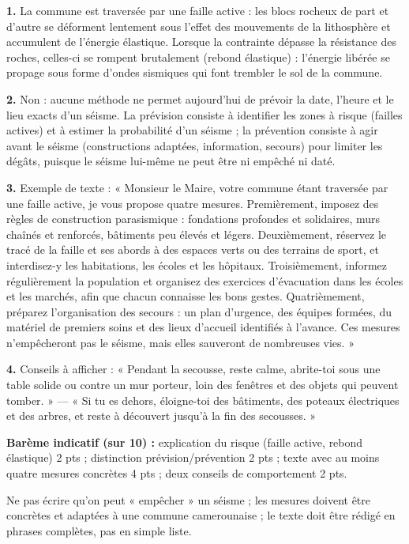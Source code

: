 \documentclass[11pt]{article}
\newcommand{\cle}[1]{{\popxbold\color{popdark}#1}}
\begin{document}
\begin{corrige}
\textbf{1.} La commune est traversée par une faille active : les blocs rocheux de part et d'autre se déforment lentement sous l'effet des mouvements de la lithosphère et accumulent de l'énergie élastique. Lorsque la contrainte dépasse la résistance des roches, celles-ci se rompent brutalement (rebond élastique) : l'énergie libérée se propage sous forme d'ondes sismiques qui font trembler le sol de la commune.

\textbf{2.} Non : aucune méthode ne permet aujourd'hui de prévoir la date, l'heure et le lieu exacts d'un séisme. La \cle{prévision} consiste à identifier les zones à risque (failles actives) et à estimer la probabilité d'un séisme ; la \cle{prévention} consiste à agir avant le séisme (constructions adaptées, information, secours) pour limiter les dégâts, puisque le séisme lui-même ne peut être ni empêché ni daté.

\textbf{3.} Exemple de texte : « Monsieur le Maire, votre commune étant traversée par une faille active, je vous propose quatre mesures. Premièrement, imposez des règles de construction parasismique : fondations profondes et solidaires, murs chaînés et renforcés, bâtiments peu élevés et légers. Deuxièmement, réservez le tracé de la faille et ses abords à des espaces verts ou des terrains de sport, et interdisez-y les habitations, les écoles et les hôpitaux. Troisièmement, informez régulièrement la population et organisez des exercices d'évacuation dans les écoles et les marchés, afin que chacun connaisse les bons gestes. Quatrièmement, préparez l'organisation des secours : un plan d'urgence, des équipes formées, du matériel de premiers soins et des lieux d'accueil identifiés à l'avance. Ces mesures n'empêcheront pas le séisme, mais elles sauveront de nombreuses vies. »

\textbf{4.} Conseils à afficher : « Pendant la secousse, reste calme, abrite-toi sous une table solide ou contre un mur porteur, loin des fenêtres et des objets qui peuvent tomber. » — « Si tu es dehors, éloigne-toi des bâtiments, des poteaux électriques et des arbres, et reste à découvert jusqu'à la fin des secousses. »

\textbf{Barème indicatif (sur 10) :} explication du risque (faille active, rebond élastique) 2 pts ; distinction prévision/prévention 2 pts ; texte avec au moins quatre mesures concrètes 4 pts ; deux conseils de comportement 2 pts.

\begin{attention}
Ne pas écrire qu'on peut « empêcher » un séisme ; les mesures doivent être concrètes et adaptées à une commune camerounaise ; le texte doit être rédigé en phrases complètes, pas en simple liste.
\end{attention}
\end{corrige}
\end{document}
